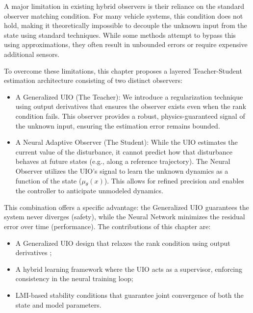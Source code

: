 A major limitation in existing hybrid observers is their reliance on the standard observer matching condition. For many vehicle systems, this condition does not hold, making it theoretically impossible to decouple the unknown input from the state using standard techniques. While some methods attempt to bypass this using approximations, they often result in unbounded errors or require expensive additional sensors.

To overcome these limitations, this chapter proposes a layered Teacher-Student estimation architecture consisting of two distinct observers:
\begin{itemize}
    \item  A Generalized UIO (The Teacher): We introduce a regularization technique using output derivatives that ensures the observer exists even when the rank condition fails. This observer provides a robust, physics-guaranteed signal of the unknown input, ensuring the estimation error remains bounded. 
    
    \item A Neural Adaptive Observer (The Student): While the UIO estimates the current value of the disturbance, it cannot predict how that disturbance behaves at future states (e.g., along a reference trajectory). The Neural Observer utilizes the UIO's signal to learn the unknown dynamics as a function of the state ($\mu_\theta(x)$). This allows for refined precision and enables the controller to anticipate unmodeled dynamics.
\end{itemize}
This combination offers a specific advantage: the Generalized UIO guarantees the system never diverges (safety), while the Neural Network minimizes the residual error over time (performance). The contributions of this chapter are:
\begin{itemize}
    \item A Generalized UIO design that relaxes the rank condition using output derivatives ;
    \item A hybrid learning framework where the UIO acts as a supervisor, enforcing consistency in the neural training loop; 
    \item LMI-based stability conditions that guarantee joint convergence of both the state and model parameters. 
\end{itemize}




